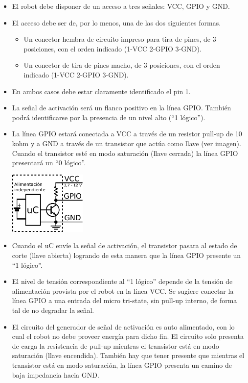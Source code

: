 \documentclass[a4paper,11pt]{article}
\begin{document}
\begin{itemize}
  \item El robot debe disponer de un acceso a tres señales: VCC, GPIO y GND.
  \item El acceso debe ser de, por lo menos, una de las dos siguientes formas.
  \begin{itemize}
    \item Un conector hembra de circuito impreso para tira de pines, de 3 posiciones, con el orden indicado (1-VCC 2-GPIO 3-GND).
    \item Un conector de tira de pines macho, de 3 posiciones, con el orden indicado (1-VCC 2-GPIO 3-GND).
  \end{itemize}
  \item En ambos casos debe estar claramente identificado el pin 1.
  \item La señal de activación será un flanco positivo en la línea GPIO. También podrá identificarse por la presencia de un nivel alto (``1 lógico'').
  \item La línea GPIO estará conectada a VCC a través de un resistor pull-up de 10 kohm y a GND a través de un transistor que actúa como llave (ver imagen). Cuando el transistor esté en modo saturación (llave cerrada) la línea GPIO presentará un ``0 lógico''.
  \begin{center}
    \includegraphics[width=0.3\textwidth]{signalstarter_sch}
  \end{center}
  \item Cuando el uC envíe la señal de activación, el transistor pasara al estado de corte (llave abierta) logrando de esta manera que la línea GPIO presente un ``1 lógico''.
  \item El nivel de tensión correspondiente al ``1 lógico'' depende de la tensión de alimentación provista por el robot en la línea VCC. Se sugiere conectar la línea GPIO a una entrada del micro tri-state, sin pull-up interno, de forma tal de no degradar la señal.
  \item El circuito del generador de señal de activación es auto alimentado, con lo cual el robot no debe proveer energía para dicho fin. El circuito solo presenta de carga la resistencia de pull-up mientras el transistor está en modo saturación (llave encendida). También hay que tener presente que mientras el transistor está en modo saturación, la línea GPIO presenta un camino de baja impedancia hacia GND.

\end{itemize}
\end{document}

